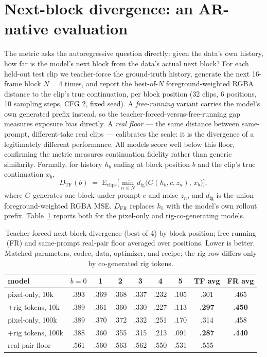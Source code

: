 \documentclass[10pt,twocolumn]{article}
\begin{document}
\section{Next-block divergence: an AR-native evaluation}
The metric asks the autoregressive question directly: given the data's own history, how far is the model's next block
from the data's actual next block? For each held-out test clip we teacher-force the ground-truth history, generate the
next 16-frame block $N{=}4$ times, and report the best-of-$N$ foreground-weighted RGBA distance to the clip's true
continuation, per block position (32 clips, 6 positions, 10 sampling steps, CFG 2, fixed seed). A \emph{free-running}
variant carries the model's own generated prefix instead, so the teacher-forced-versus-free-running gap measures
exposure bias directly. A \emph{real floor} — the same distance between same-prompt, different-take real clips —
calibrates the scale: it is the divergence of a legitimately different performance. All models score well below this
floor, confirming the metric measures continuation fidelity rather than generic similarity.
Formally, for history $h_b$ ending at block position $b$ and the clip's true continuation $x_b$,
\[
D_{\mathrm{TF}}(b) \;=\; \mathrm{E}_{\mathrm{clips}}\Big[\min_{n\le N} d_{\mathrm{fg}}\big(G(h_b, c, z_n),\, x_b\big)\Big],
\]
where $G$ generates one block under prompt $c$ and noise $z_n$, and $d_{\mathrm{fg}}$ is the union-foreground-weighted
RGBA MSE. $D_{\mathrm{FR}}$ replaces $h_b$ with the model's own rollout prefix. Table~\ref{tab:divergence} reports
both for the pixel-only and rig-co-generating models.

\begin{table}[t]\centering\caption{Teacher-forced next-block divergence (best-of-4) by block position; free-running
(FR) and same-prompt real-pair floor averaged over positions. Lower is better. Matched parameters, codec, data,
optimizer, and recipe; the rig row differs only by co-generated rig tokens.}\label{tab:divergence}\scriptsize
\setlength{\tabcolsep}{3.2pt}
\begin{tabular}{@{}lcccccc c c@{}}
\toprule
model & $b{=}0$ & 1 & 2 & 3 & 4 & 5 & TF avg & FR avg \\
\midrule
pixel-only, 10k & .393 & .369 & .368 & .337 & .232 & .105 & .301 & .465 \\
+rig tokens, 10k & .389 & .361 & .360 & .330 & .227 & .113 & \textbf{.297} & \textbf{.450} \\
pixel-only, 100k & .389 & .370 & .372 & .332 & .251 & .170 & .314 & .458 \\
+rig tokens, 100k & .388 & .360 & .355 & .315 & .213 & .091 & \textbf{.287} & \textbf{.440} \\
\midrule
real-pair floor & .561 & .560 & .563 & .562 & .550 & .531 & .555 & — \\
\bottomrule
\end{tabular}
\end{table}
\end{document}
